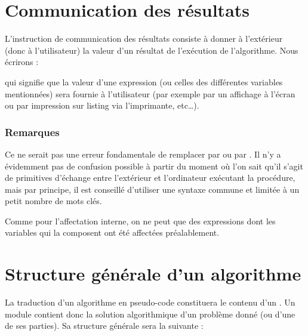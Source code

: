 	\section{Communication des résultats}

		L’instruction de communication des résultats consiste à donner à
		l’extérieur (donc à l’utilisateur) la valeur d’un résultat de
		l’exécution de l’algorithme. Nous écrirons :


		qui signifie que la valeur d’une expression (ou celles des différentes
		variables mentionnées) sera fournie à l’utilisateur (par exemple par un
		affichage à l’écran ou par impression sur listing via l’imprimante,
		etc\dots).

		\subsubsection*{Remarques}

		\begin{liste}
		\item
			Ce ne serait pas une erreur fondamentale de remplacer
			 par  ou
			 par . Il n’y a
			évidemment pas de confusion possible à partir du moment où l’on sait
			qu’il s’agit de primitives d’échange entre l’extérieur et l’ordinateur
			exécutant la procédure, mais par principe, il est conseillé d’utiliser
			une syntaxe commune et limitée à un petit nombre de mots clés.
		\item
			Comme pour l’affectation interne, on ne peut 
			que des expressions dont les variables qui la composent ont été 
			affectées préalablement.
		\end{liste}

	\section{Structure générale d’un algorithme}

		La traduction d’un algorithme en pseudo-code constituera le contenu d’un
		. Un module contient donc la solution
		algorithmique d’un problème donné (ou d’une de ses parties). Sa
		structure générale sera la suivante :

